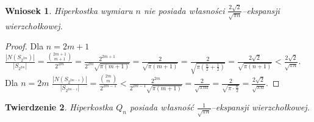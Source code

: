 \documentclass{pracamgr}
\newtheorem{theorem}{Twierdzenie}
\newtheorem{corollary}[theorem]{Wniosek}
\begin{document}
   \begin{corollary}\label{ograniczenie ekspansji}
    Hiperkostka wymiaru $n$ nie posiada własności $\frac{2\sqrt{2}}{\sqrt{\pi n}}$--ekspansji wierzchołkowej.
   \end{corollary}
   \begin{proof}%
    Dla $n=2m+1$\newline
    $\frac{|N(S_{2^{2m}})|}{|S_{2^{2m}}|}=\frac{{2m+1 \choose m+1}}{2^{2m}}=\frac{2^{2m+1}}{2^{2m}\sqrt{\pi(m+1)}}=\frac{2}{\sqrt{\pi(m+1)}}=
    \frac{2}{\sqrt{\pi(\frac{n}{2}+\frac{1}{2})}}=\frac{2\sqrt{2}}{\sqrt{\pi(n+1)}}<\frac{2\sqrt{2}}{\sqrt{\pi n}}$.\newline
    Dla $n=2m$
    $\frac{|N(S_{2^{2m-1}})|}{|S_{2^{2m-1}}|}=\frac{{2m \choose m}}{2^{2m-1}}<\frac{2^{2m}}{2^{2m-1}\sqrt{\pi(m+1)}}=\frac{2}{\sqrt{\pi m}}=
    \frac{2}{\sqrt{\pi\cdot\frac{n}{2}}}=\frac{2\sqrt{2}}{\sqrt{\pi n}}$.
   \end{proof}
   \begin{theorem}\label{ekspansja kostki}%
    Hiperkostka $Q_n$ posiada własność $\frac{1}{\sqrt{\pi n}}$--ekspansji wierzchołkowej.
   \end{theorem}
\end{document}

